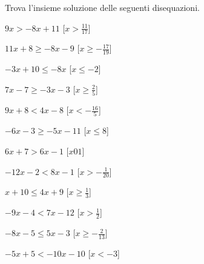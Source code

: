 \begin{esercizio}\label{ese:dis_12}
 Trova l'insieme soluzione delle seguenti disequazioni.
\begin{multicols}{2}
 \begin{enumeratea}
  \item  $9 x  > -8 x +11$ \hfill [$x > \frac{11}{17}$]
  \item  $11 x +8 \ge -8 x -9$ \hfill [$x \ge -\frac{17}{19}$]
  \item  $-3 x +10 \le -8 x $ \hfill [$x \le -2$]
  \item  $7 x -7 \ge -3 x -3$ \hfill [$x \ge \frac{2}{5}$]
  \item  $9 x +8 < 4 x -8$ \hfill [$x < -\frac{16}{5}$]
  \item  $-6 x -3 \ge -5 x -11$ \hfill [$x \le 8$]
  \item  $6 x +7 > 6 x -1$ \hfill [$x {0} {1}$]
  \item  $-12 x -2 < 8 x -1$ \hfill [$x > -\frac{1}{20}$]
  \item  $x +10 \le 4 x +9$ \hfill [$x \ge \frac{1}{3}$]
  \item  $-9 x -4 < 7 x -12$ \hfill [$x > \frac{1}{2}$]
  \item  $-8 x -5 \le 5 x -3$ \hfill [$x \ge -\frac{2}{13}$]
  \item  $-5 x +5 < -10 x -10$ \hfill [$x < -3$]
 \end{enumeratea}
\end{multicols}
\end{esercizio}

